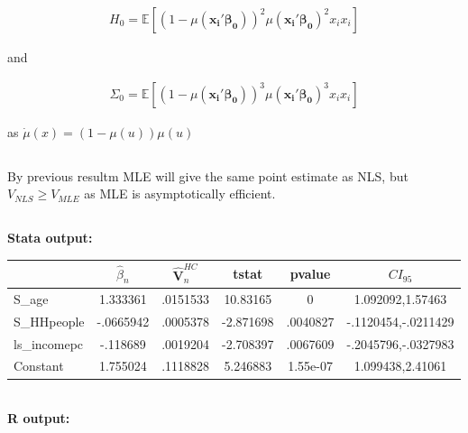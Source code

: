 \documentclass[12pt]{article}
\newcommand{\E}{\mathbb{E}}
\begin{document}
\begin{align*}
  H_0 = \E[(1-\mu(\mathbf{x_i'\beta_0}))^2\mu(\mathbf{x_i'\beta_0})^2x_ix_i]
\end{align*}

and

\begin{align*}
  \Sigma_0 = \E[(1-\mu(\mathbf{x_i'\beta_0}))^3\mu(\mathbf{x_i'\beta_0})^3x_ix_i]
\end{align*}

as $\dot\mu(x) = (1-\mu(u))\mu(u)$

\subsection{}
By previous resultm MLE will give the same point estimate as NLS, but $V_{NLS}\geq V_{MLE}$ as MLE is asymptotically efficient.

\subsection{}
\subsubsection{}


\textbf{Stata output:}\\

\begin{tabular}{lccccc}
  \hline

 &           $\hat \beta_n$&         $\mathbf{\hat V}_n^{HC}$ &           t\-stat &           p\-value &        $CI_{95}$\\
\hline
S\_age        &    1.333361&    .0151533&    10.83165&           0&1.092092,1.57463\\
S\_HHpeople  &   -.0665942&    .0005378&   -2.871698&    .0040827&-.1120454,-.0211429\\
ls\_incomepc &    -.118689&    .0019204&   -2.708397&    .0067609&-.2045796,-.0327983\\
Constant       &    1.755024&    .1118828&    5.246883&    1.55e-07&1.099438,2.41061\\
\hline
\end{tabular}
\vspace{1cm}\\
\textbf{R output:}\\
\end{document}
